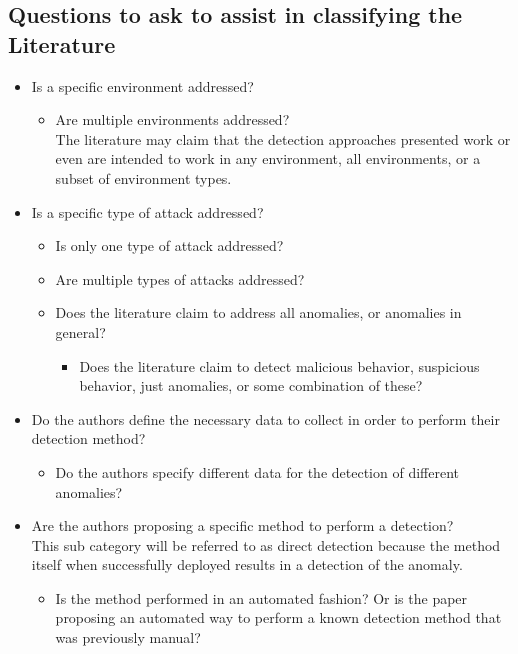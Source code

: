 \documentclass[10pt]{IEEEtran}
\begin{document}
\subsection{Questions to ask to assist in classifying the Literature}
\begin{itemize}
    \item Is a specific environment addressed?
        \begin{itemize}
            \item Are multiple environments addressed?\\
            The literature may claim that the detection approaches presented work or even are intended to work in any environment, all environments, or a subset of environment types.
        \end{itemize}
    \item Is a specific type of attack addressed?
    \begin{itemize}
        \item Is only one type of attack addressed?
        \item Are multiple types of attacks addressed?
        \item Does the literature claim to address all anomalies, or anomalies in general?
        \begin{itemize}
            \item Does the literature claim to detect malicious behavior, suspicious behavior, just anomalies, or some combination of these?
        \end{itemize}
    \end{itemize}
    \item Do the authors define the necessary data to collect in order to perform their detection method?
        \begin{itemize}
            \item Do the authors specify different data for the detection of different anomalies?
        \end{itemize}
    \item Are the authors proposing a specific method to perform a detection?\\
    This sub category will be referred to as direct detection because the method itself when successfully deployed results in a detection of the anomaly. 
        \begin{itemize}
            \item Is the method performed in an automated fashion? Or is the paper proposing an automated way to perform a known detection method that was previously manual?

\end{itemize}
\end{itemize}
\end{document}
